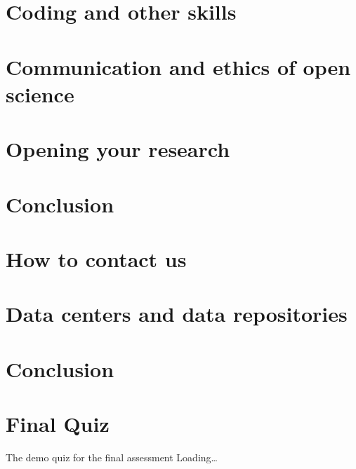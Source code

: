 \documentclass[
]{book}
\begin{document}
\hypertarget{coding-and-other-skills}{%
\chapter{Coding and other skills}\label{coding-and-other-skills}}

\hypertarget{communication-and-ethics-of-open-science}{%
\chapter{Communication and ethics of open science}\label{communication-and-ethics-of-open-science}}

\hypertarget{opening-your-research}{%
\chapter{Opening your research}\label{opening-your-research}}

\hypertarget{conclusion}{%
\chapter{Conclusion}\label{conclusion}}

\hypertarget{how-to-contact-us}{%
\chapter{How to contact us}\label{how-to-contact-us}}

\hypertarget{data-centers-and-data-repositories-1}{%
\chapter{Data centers and data repositories}\label{data-centers-and-data-repositories-1}}

\hypertarget{conclusion-1}{%
\chapter{Conclusion}\label{conclusion-1}}

\hypertarget{final-quiz}{%
\chapter{Final Quiz}\label{final-quiz}}

The demo quiz for the final assessment
Loading\ldots{}

  
\end{document}
